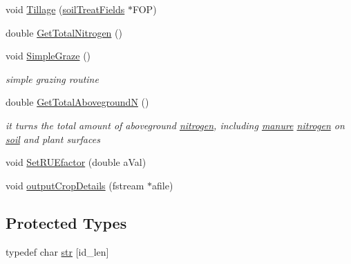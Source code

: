 \begin{DoxyCompactItemize}
void \hyperlink{classecosystem_a4b7c3eb9b9c14b213e9862854dda23ab}{Tillage} (\hyperlink{classsoil_treat_fields}{soilTreatFields} $\ast$FOP)
\item 
double \hyperlink{classecosystem_a3bc724205cfe7821bb4cbf468b339d9c}{GetTotalNitrogen} ()
\item 
void \hyperlink{classecosystem_aeded9da6bd5084389b3740acf00b871c}{SimpleGraze} ()
\begin{DoxyCompactList}\small\item\em simple grazing routine \item\end{DoxyCompactList}\item 
double \hyperlink{classecosystem_a77d52404322e889afa3ba3f877e6c688}{GetTotalAbovegroundN} ()
\begin{DoxyCompactList}\small\item\em it turns the total amount of aboveground \hyperlink{classnitrogen}{nitrogen}, including \hyperlink{classmanure}{manure} \hyperlink{classnitrogen}{nitrogen} on \hyperlink{classsoil}{soil} and plant surfaces \item\end{DoxyCompactList}\item 
void \hyperlink{classecosystem_a5b1f3bbeed25c72f36d6e0ef552a9182}{SetRUEfactor} (double aVal)
\item 
void \hyperlink{classecosystem_a86e66b4cea99a0c47c8fef670d4e4a15}{outputCropDetails} (fstream $\ast$afile)
\end{DoxyCompactItemize}
\subsection*{Protected Types}
\begin{DoxyCompactItemize}
\item 
typedef char \hyperlink{classecosystem_aba225e015239959504f5d8eb23064948}{str} \mbox{[}id\_\-len\mbox{]}
\end{DoxyCompactItemize}
